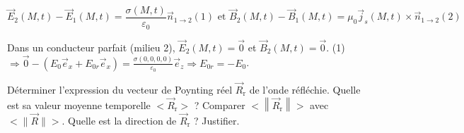 \begin{quest}
{            $$
            \vec{E}_2(M, t)-\vec{E}_1(M, t)=\frac{\sigma(M, t)}{\varepsilon_0} \vec{n}_{1 \rightarrow 2}(1) \text { et } \vec{B}_2(M, t)-\vec{B}_1(M, t)=\mu_0 \vec{j}_s(M, t) \times \vec{n}_{1 \rightarrow 2}(2)
            $$
            
            
            Dans un conducteur parfait (milieu 2), $\vec{E}_2(M, t)=\overrightarrow{0}$ et $\vec{B}_2(M, t)=\overrightarrow{0}$.
            (1) $\Rightarrow \overrightarrow{0}-\left(E_0 \vec{e}_x+E_{0 r} \vec{e}_x\right)=\frac{\sigma(0,0,0,0)}{\varepsilon_0} \vec{e}_z \Rightarrow E_{0 r}=-E_0$.
        }
        \item Déterminer l'expression du vecteur de Poynting réel \(\Vec{R}_{\mathrm{r}}\) de l'onde réfléchie. Quelle est sa valeur moyenne temporelle \(<\Vec{R}_{\mathrm{r}}>\) ? Comparer \(<\left\|\Vec{R}_{\mathrm{r}}\right\|>\) avec \(<\|\Vec{R}\|>\). Quelle est la direction de \(\Vec{R}_{\mathrm{r}}\) ? Justifier.
    \end{quest}
        
